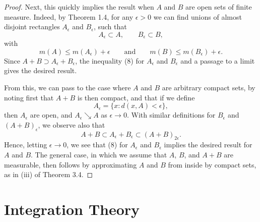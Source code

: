 \documentclass[11pt,openany]{book}
\renewcommand{\thesection}{\arabic{section}}
\begin{document}
\begin{proof}
Next, this quickly implies the result when $A$ and $B$ are open sets of finite measure. Indeed, by Theorem 1.4, for any $\epsilon>0$ we can find unions of almost disjoint rectangles $A_\epsilon$ and $B_\epsilon$, such that
\[
 A_\epsilon\subset A,\qquad B_\epsilon\subset B,
\]
with
\[
 m(A)\le m(A_\epsilon)+\epsilon
 \qquad\text{and}\qquad
 m(B)\le m(B_\epsilon)+\epsilon.
\]
Since $A+B\supset A_\epsilon+B_\epsilon$, the inequality (8) for $A_\epsilon$ and $B_\epsilon$ and a passage to a limit gives the desired result.

From this, we can pass to the case where $A$ and $B$ are arbitrary compact sets, by noting first that $A+B$ is then compact, and that if we define
\[
 A_\epsilon=\{x:d(x,A)<\epsilon\},
\]
then $A_\epsilon$ are open, and $A_\epsilon\searrow A$ as $\epsilon\to0$. With similar definitions for $B_\epsilon$ and $(A+B)_\epsilon$, we observe also that
\[
 A+B\subset A_\epsilon+B_\epsilon\subset(A+B)_{2\epsilon}.
\]
Hence, letting $\epsilon\to0$, we see that (8) for $A_\epsilon$ and $B_\epsilon$ implies the desired result for $A$ and $B$. The general case, in which we assume that $A$, $B$, and $A+B$ are measurable, then follows by approximating $A$ and $B$ from inside by compact sets, as in (iii) of Theorem 3.4.
\end{proof}


%

\chapter{Integration Theory}
\end{document}
